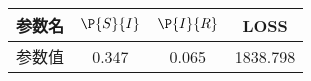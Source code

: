 \begin{tabular}{cccc}
\hline
参数名&$\P{S}{I}$&$\P{I}{R}$&LOSS\\
\hline
参数值&0.347&0.065&1838.798\\
\hline
\end{tabular}